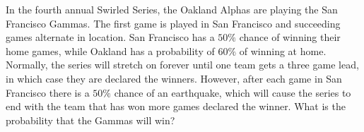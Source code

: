 In the fourth annual Swirled Series, the Oakland Alphas are playing the San Francisco Gammas. The first game is played in San Francisco and succeeding games alternate in location. San Francisco has a $50\%$ chance of winning their home games, while Oakland has a probability of $60\%$ of winning at home. Normally, the series will stretch on forever until one team gets a three game lead, in which case they are declared the winners. However, after each game in San Francisco there is a $50\%$ chance of an earthquake, which will cause the series to end with the team that has won more games declared the winner. What is the probability that the Gammas will win?